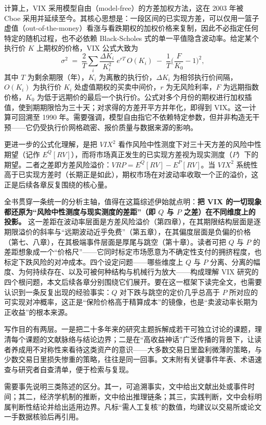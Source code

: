 \documentclass[11pt,a4paper]{ctexart}
\begin{document}
计算上，VIX 采用模型自由（model-free）的方差加权方法，这在 2003 年被 Cboe 采用并延续至今。其核心思想是：一段区间的已实现方差，可以仅用一篮子虚值（out-of-the-money）看涨与看跌期权的加权价格来复制，因此不必指定任何特定的随机过程，也不必依赖 Black-Scholes 式的单一平值隐含波动率。给定某个执行价 $K$ 上期权的价格，VIX 公式大致为
\[
\sigma^2 \;=\; \frac{2}{T}\sum_i \frac{\Delta K_i}{K_i^2}\;e^{rT}\,O(K_i) \;-\; \frac{1}{T}\Big(\frac{F}{K_0}-1\Big)^2,
\]
其中 $T$ 为剩余期限（年），$K_i$ 为离散的执行价，$\Delta K_i$ 为相邻执行价间隔，$O(K_i)$ 为执行价 $K_i$ 处虚值期权的买卖中间价，$r$ 为无风险利率，$F$ 为远期指数价格，$K_0$ 为低于远期价的最后一个执行价。公式对多个月份的期权进行加权插值，使到期期限恰为三十天；对求得的方差开平方并年化，即得到 VIX。这一计算可回溯至 1990 年。需要强调，模型自由指它不依赖特定参数，但并非构造无干预——它仍受执行价网格疏密、报价质量与数据来源的影响。

更进一步的公式化理解，是把 $VIX^2$ 看作风险中性测度下对三十天方差的风险中性期望（记作 $E^Q[RV]$），而将市场真正发生的已实现方差视为现实测度（$P$）下的期望。二者之差即方差风险溢价：$VRP = E^Q[RV] - E^P[RV]$。当 $VIX^2$ 系统性高于已实现方差时（长期正是如此），期权市场在对波动率收取一个正的溢价，这正是后续各章反复围绕的核心量。

全书贯穿一条统一的分析主轴，值得在这篇综述伊始就点明：\textbf{把 VIX 的一切现象都还原为“风险中性测度与现实测度的差距”（即 $Q$ 与 $P$ 之差）在不同维度上的投影。} 这一差距在波动率层面是方差风险溢价（第四章），在其期限结构层面是逐期限溢价的斜率与“远期波动近乎免费”（第五章），在其偏度层面是负偏的价格（第七、八章），在其极端事件层面是厚尾与跳空（第十章）。读者可把 $Q$ 与 $P$ 的差距想象成一个“价格尺”——它同时标定市场愿意为不确定性支付的拥挤程度，也标定下跌风险的对冲成本。四个设定问题——哪些维度上 $Q$ 与 $P$ 分离、分离的幅度、为何持续存在、以及可被何种结构与机械行为放大——构成理解 VIX 研究的四个根问题，本文后续各章分别围绕它们展开。要在这一框架下读完全文，也需要认识到一条反复出现的经验事实：$Q$ 对下跌与跳空的定价几乎总高于 $P$ 所对应的可实现对冲概率，这正是“保险价格高于精算成本”的镜像，也是“卖波动率长期为正收益”的根本来源。

写作目的有两层。一是把二十多年来的研究主题拆解成若干可独立讨论的课题，理清每个课题的文献脉络与结论边界；二是在“高收益神话”广泛传播的背景下，让读者养成用不对称性来看待这类资产的意识——大多数交易日里盈利微薄的策略，与少数交易日里损失惨重的策略，往往是同一回事。文末附有关键事件年表、术语速查与研究者自查清单，便于检索与复现。

需要事先说明三类陈述的区分。其一，可追溯事实，文中给出文献出处或事件时间；其二，经济学机制的推断，文中给出推理链条；其三，实践判断，文中会标明属判断性结论并给出适用边界。凡标“需人工复核”的数值，均建议以交易所或论文一手数据核验后再引用。
\end{document}
